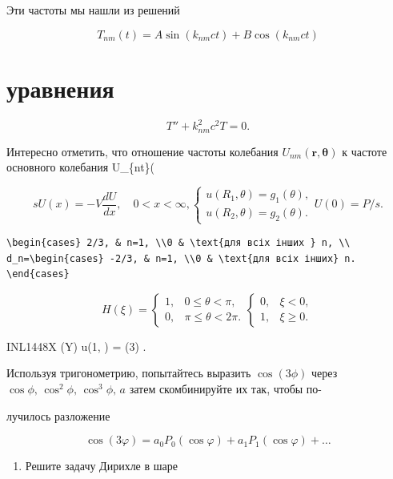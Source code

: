 \documentclass[
  ukrainian,
]{article}
\providecommand{\tightlist}{%
  \setlength{\itemsep}{0pt}\setlength{\parskip}{0pt}}
\begin{document}
Эти частоты мы нашли из решений

\[
T_{nm}(t) = A \sin(k_{nm}ct) + B \cos(k_{nm}ct)
\]

\section{уравнения}\label{ux443ux440ux430ux432ux43dux435ux43dux438ux44f}

\[
T'' + k_{nm}^2 c^2 T = 0.
\]

Интересно отметить, что отношение частоты колебания
\(U_{nm}(\mathbf{r}, \mathbf{\theta})\) к частоте основного колебания
U\_\{nt\}(\ma

\[
sU(x) = -V \frac{dU}{dx}, \quad 0 < x < \infty,
\begin{cases} u(R_1, \theta) = g_1(\theta), \\ u(R_2, \theta) = g_2(\theta). \end{cases}
U(0) = P/s.
\]

\begin{verbatim}
\begin{cases} 2/3, & n=1, \\0 & \text{для всіх інших } n, \\ d_n=\begin{cases} -2/3, & n=1, \\0 & \text{для всіх інших} n. \end{cases}
\end{verbatim}

\[
H(\xi) =
\begin{cases} 1, & 0 \le \theta < \pi, \\ 0, & \pi \le \theta < 2\pi. \end{cases}
\begin{cases} 0, & \xi < 0, \\ 1, & \xi \geqslant 0. \end{cases}
\]

INL1448X (\Gamma Y) u(1, \varphi) = \cos(3\varphi) .

Используя тригонометрию, попытайтесь выразить \(\cos{(3\phi)}\) через
\(\cos{\phi}, \, \cos^2{\phi}, \, \cos^3{\phi}, \, a\) затем
скомбинируйте их так, чтобы по-

лучилось разложение

\[
\cos(3\varphi) = a_0 P_0(\cos\varphi) + a_1 P_1(\cos\varphi) + \dots
\]

\begin{enumerate}
\def\labelenumi{\arabic{enumi}.}
\setcounter{enumi}{4}
\tightlist
\item
  Решите задачу Дирихле в шаре
\end{enumerate}
\end{document}
